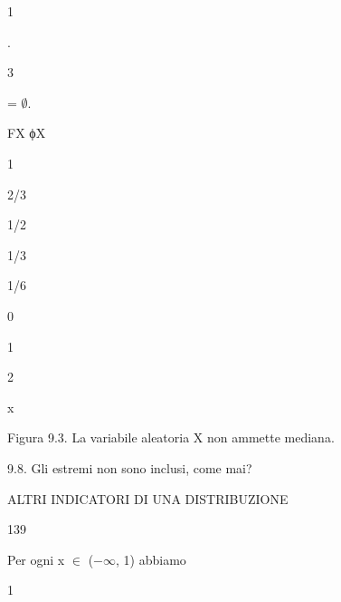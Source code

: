 \documentclass[a4paper,portrait,12pt]{article}
\begin{document}
1


.


3





= $\emptyset$.





\begin{flushleft}
FX ϕX
\end{flushleft}





1


2/3


1/2


1/3


1/6


0





1





2





\begin{flushleft}
x
\end{flushleft}





\begin{flushleft}
Figura 9.3. La variabile aleatoria X non ammette mediana.
\end{flushleft}


\begin{flushleft}
9.8. Gli estremi non sono inclusi, come mai?
\end{flushleft}





\begin{flushleft}
 ALTRI INDICATORI DI UNA DISTRIBUZIONE
\end{flushleft}





139





\begin{flushleft}
Per ogni x $\in$ ($-$$\infty$, 1) abbiamo
\end{flushleft}


1
\end{document}
